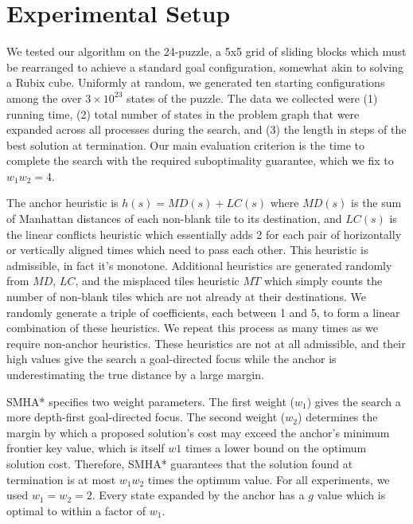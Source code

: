 \documentclass[11pt]{article}
\begin{document}
{\section{Experimental Setup}

We tested our algorithm on the 24-puzzle, a 5x5 grid of sliding blocks which must be rearranged to achieve a standard goal configuration, somewhat akin to solving a Rubix cube. Uniformly at random, we generated ten starting configurations among the over $3\times 10^{23}$ states of the puzzle. The data we collected were (1) running time, (2) total number of states in the problem graph that were expanded across all processes during the search, and (3) the length in steps of the best solution at termination. Our main evaluation criterion is the time to complete the search with the required suboptimality guarantee, which we fix to $w_1 w_2 = 4$.

The anchor heuristic is $h(s) = MD(s) + LC(s)$ where $MD(s)$ is the sum of Manhattan distances of each non-blank tile to its destination, and $LC(s)$ is the linear conflicts heuristic which essentially adds 2 for each pair of horizontally or vertically aligned times which need to pass each other. This heuristic is admissible, in fact it's monotone. Additional heuristics are generated randomly from $MD$, $LC$, and the misplaced tiles heuristic $MT$ which simply counts the number of non-blank tiles which are not already at their destinations. We randomly generate a triple of coefficients, each between 1 and 5, to form a linear combination of these heuristics. We repeat this process as many times as we require non-anchor heuristics. These heuristics are not at all admissible, and their high values give the search a goal-directed focus while the anchor is underestimating the true distance by a large margin.


SMHA* specifies two weight parameters. The first weight ($w_1$) gives the search a more depth-first goal-directed focus. The second weight ($w_2$) determines the margin by which a proposed solution's cost may exceed the anchor's minimum frontier key value, which is itself $w1$ times a lower bound on the optimum solution cost. Therefore, SMHA* guarantees that the solution found at termination is at most $w_1 w_2$ times the optimum value. For all experiments, we used $w_1 = w_2 = 2$. Every state expanded by the anchor has a $g$ value which is optimal to within a factor of $w_1$.

}
\end{document}

